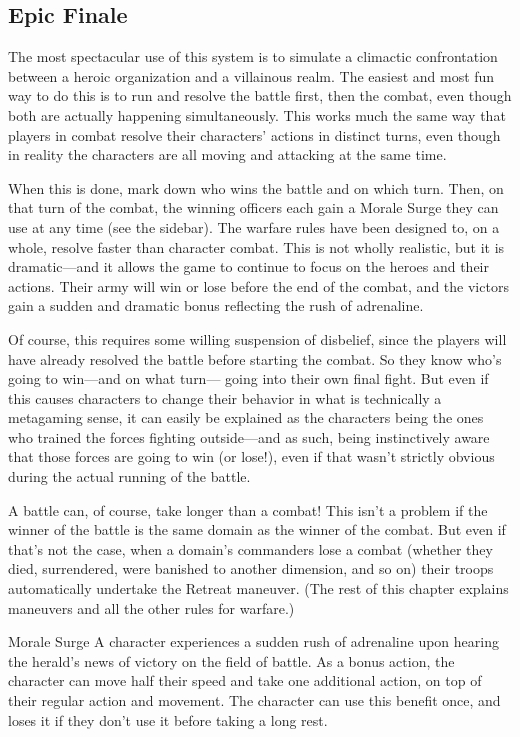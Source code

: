 \documentclass[10pt,a4paper,twoside,bg=print,twocolumn,openany,nodeprecatedcode]{dndbook}
\begin{document}
\subsection{Epic Finale}
The most spectacular use of this system is to simulate a climactic confrontation between a heroic organization and a villainous realm. The easiest and most fun way to do this is to run and resolve the battle first, then the combat, even though both are actually happening simultaneously. This works much the same way that players in combat resolve their characters' actions in distinct turns, even though in reality the characters are all moving and attacking at the same time.

When this is done, mark down who wins the battle and on which turn. Then, on that turn of the combat, the winning officers each gain a Morale Surge they can use at any time (see the sidebar). The warfare rules have been designed to, on a whole, resolve faster than character combat. This is not wholly realistic, but it is dramatic—and it allows the game to continue to focus on the heroes and their actions. Their army will win or lose before the end of the combat, and the victors gain a sudden and dramatic bonus reflecting the rush of adrenaline.

Of course, this requires some willing suspension of disbelief, since the players will have already resolved the battle before starting the combat. So they know who's going to win—and on what turn— going into their own final fight. But even if this causes characters to change their behavior in what is technically a metagaming sense, it can easily be explained as the characters being the ones who trained the forces fighting outside—and as such, being instinctively aware that those forces are going to win (or lose!), even if that wasn't strictly obvious during the actual running of the battle.

A battle can, of course, take longer than a combat! This isn't a problem if the winner of the battle is the same domain as the winner of the combat. But even if that's not the case, when a domain's commanders lose a combat (whether they died, surrendered, were banished to another dimension, and so on) their troops automatically undertake the Retreat maneuver. (The rest of this chapter explains maneuvers and all the other rules for warfare.)

\begin{DndSidebar}[float=!b]{Morale Surge}
A character experiences a sudden rush of adrenaline upon hearing the herald's news of victory on the field of battle. As a bonus action, the character can move half their speed and take one additional action, on top of their regular action and movement. The character can use this benefit once, and loses it if they don't use it before taking a long rest.



\end{DndSidebar}
\end{document}
